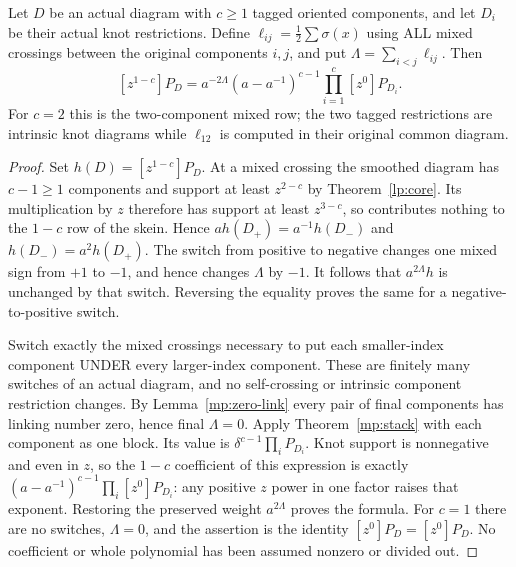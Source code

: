 \begin{theorem}\label{mp:lowest}
Let $D$ be an actual diagram with $c\geq1$ tagged oriented components,
and let $D_i$ be their actual knot restrictions. Define
$\ell_{ij}=\tfrac12\sum\sigma(x)$ using ALL mixed crossings between
the original components $i,j$, and put $\Lambda=\sum_{i<j}\ell_{ij}$.
Then
\begin{equation}\label{mp:lowest-value}
 [z^{1-c}]P_D
 =a^{-2\Lambda}(a-a^{-1})^{c-1}
       \prod_{i=1}^c[z^0]P_{D_i}.
\end{equation}
For $c=2$ this is the two-component mixed row; the two
tagged restrictions are intrinsic knot diagrams while $\ell_{12}$ is
computed in their original common diagram.
\end{theorem}
\begin{proof}
Set $h(D)=[z^{1-c}]P_D$. At a mixed crossing the smoothed diagram has
$c-1\geq1$ components and support at least $z^{2-c}$ by
Theorem~\ref{lp:core}. Its multiplication by $z$ therefore has
support at least $z^{3-c}$, so contributes nothing to the $1-c$ row
of the skein. Hence $a h(D_+)=a^{-1}h(D_-)$ and
$h(D_-)=a^2h(D_+)$. The switch from positive to negative changes one
mixed sign from $+1$ to $-1$, and hence changes $\Lambda$ by $-1$.
It follows that $a^{2\Lambda}h$ is unchanged by that switch. Reversing
the equality proves the same for a negative-to-positive switch.

Switch exactly the mixed crossings necessary to put each smaller-index
component UNDER every larger-index component. These are finitely many
switches of an actual diagram, and no self-crossing or intrinsic
component restriction changes. By Lemma~\ref{mp:zero-link} every pair
of final components has linking number zero, hence final $\Lambda=0$.
Apply Theorem~\ref{mp:stack} with each component as one block. Its
value is $\delta^{c-1}\prod_iP_{D_i}$. Knot support is nonnegative
and even in $z$, so the $1-c$ coefficient of this expression is exactly
$(a-a^{-1})^{c-1}\prod_i[z^0]P_{D_i}$: any positive $z$ power in one
factor raises that exponent. Restoring the preserved weight
$a^{2\Lambda}$ proves the formula. For $c=1$ there are no switches,
$\Lambda=0$, and the assertion is the identity $[z^0]P_D=[z^0]P_D$.
No coefficient or whole polynomial has been assumed nonzero or divided out.
\end{proof}

